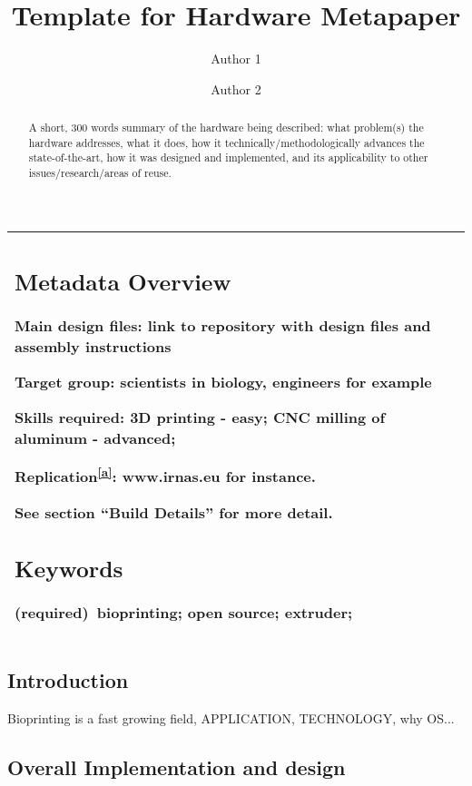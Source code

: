 \documentclass[a4paper]{article}
\title{Template for Hardware Metapaper}
\author[1]{Author 1}
\author[2]{Author 2}
\affil[1]{Author 1, Open Hardware project affiliation}
\affil[2]{Author 2, institutional affiliation}
\begin{document}
\maketitle


\begin{abstract}
A short, 300 words summary of the hardware being described: what problem(s) the hardware addresses, what it does, how it technically/methodologically advances the state-of-the-art, how it was designed and implemented, and its applicability to other issues/research/areas of reuse.
\end{abstract}

\begin{longtable}[]{@{}l@{}}
\begin{minipage}[t]{0.97\columnwidth}\raggedright\strut


\subsection{Metadata Overview}\label{h.akaipbqoqfs8}

Main design files: link to repository with design files and assembly instructions

Target group: scientists in biology, engineers for example

Skills required: 3D printing - easy; CNC milling of aluminum - advanced;

Replication\textsuperscript{\protect\hyperlink{cmnt1}{{[}a{]}}}{:
}{www.irnas.eu for instance.}

See section ``Build Details'' for more detail.


\subsection{Keywords}\label{h.kdz351yp7g7c}

{(required)}{~bioprinting; open source; extruder;}

\strut\end{minipage}\tabularnewline
\bottomrule
\end{longtable}


\subsection{Introduction}\label{h.pnj38xyr5dyy}

{Bioprinting is a fast growing field, APPLICATION, TECHNOLOGY, why OS...}


\subsection{Overall Implementation and design}\label{h.1u7vph94gfbt}
\end{document}
